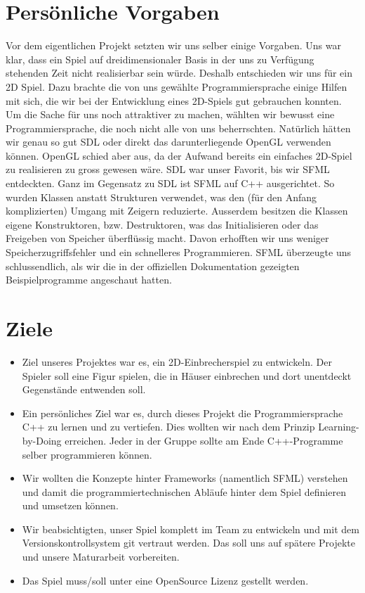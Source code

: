 \documentclass[11pt,a4paper]{scrbook}
\begin{document}
\section{Persönliche Vorgaben}

Vor dem eigentlichen Projekt setzten wir uns selber einige Vorgaben.
Uns war klar, dass ein Spiel auf dreidimensionaler Basis in der uns zu Verfügung stehenden Zeit nicht realisierbar sein würde. Deshalb entschieden wir uns für ein 2D Spiel.
Dazu brachte die von uns gewählte Programmiersprache einige Hilfen mit sich, die wir bei der Entwicklung eines 2D-Spiels gut gebrauchen konnten.
\\
Um die Sache für uns noch attraktiver zu machen, wählten wir bewusst eine Programmiersprache, die noch nicht alle von uns beherrschten.
Natürlich hätten wir genau so gut SDL oder direkt das darunterliegende OpenGL verwenden können.
OpenGL schied aber aus, da der Aufwand bereits ein einfaches 2D-Spiel zu realisieren zu gross gewesen wäre.
SDL war unser Favorit, bis wir SFML entdeckten.
Ganz im Gegensatz zu SDL ist SFML auf C++ ausgerichtet.
So wurden Klassen anstatt Strukturen verwendet, was den (für den
Anfang komplizierten) Umgang mit Zeigern reduzierte.
Ausserdem besitzen die Klassen eigene Konstruktoren, bzw. Destruktoren, was das Initialisieren
oder das Freigeben von Speicher überflüssig macht.
Davon erhofften wir uns weniger Speicherzugriffsfehler und ein schnelleres Programmieren.
SFML überzeugte uns schlussendlich, als wir die in der offiziellen Dokumentation gezeigten Beispielprogramme angeschaut hatten.

\section{Ziele}
\begin{itemize}
\item
Ziel unseres Projektes war es, ein 2D-Einbrecherspiel zu entwickeln. Der Spieler soll eine Figur spielen, die in Häuser einbrechen und dort unentdeckt Gegenstände entwenden soll.
\item
Ein persönliches Ziel war es, durch dieses Projekt die
Programmiersprache C++ zu lernen und zu vertiefen. Dies wollten wir nach dem Prinzip Learning-by-Doing erreichen. Jeder in der Gruppe sollte am Ende
C++-Programme selber programmieren können.
\item
Wir wollten
die Konzepte hinter Frameworks (namentlich SFML) verstehen und damit die
programmiertechnischen Abläufe hinter dem Spiel definieren und
umsetzen können.
\item
Wir beabsichtigten, unser Spiel komplett im Team zu entwickeln und
mit dem Versionskontrollsystem git vertraut werden. Das soll uns
auf spätere Projekte und unsere Maturarbeit vorbereiten.
\item
Das Spiel muss/soll unter eine OpenSource Lizenz gestellt werden.
\end{itemize}
\end{document}
